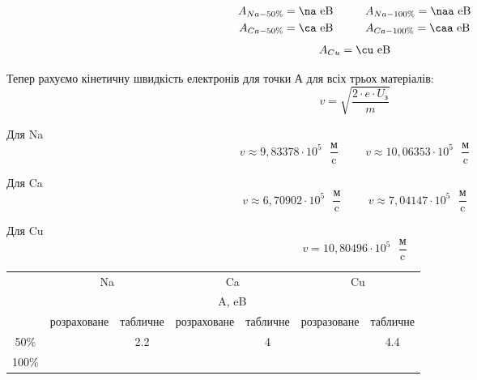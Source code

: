 \documentclass[a4paper,14pt]{extreport}
\begin{document}
	\begin{align*}
		A_{Na-50\%} &= \na \text{ eB} \hspace{1cm} A_{Na-100\%} = \naa \text{ eB}\\
		A_{Ca-50\%} &= \ca \text{ eB}\hspace{1cm}A_{Ca-100\%} = \caa \text{ eB}\\
	\end{align*}
	\begin{align*}
		A_{Cu} = \cu \text{ eB}\\
	\end{align*}
 

	Тепер рахуємо кінетичну швидкість електронів для точки А для всіх трьох матеріалів:
	\begin{equation}
		v = \sqrt{ \dfrac{2\cdot e\cdot U_{\text{з}}}{m} }
	\end{equation}



	Для Na
		$$v  \approx 9,83378\cdot 10^{5} \text{ }\dfrac{\text{м}}{\text{c}} \hspace{1cm}v \approx 10,06353 \cdot 10^{5}  \text{ }\dfrac{\text{м}}{\text{c}}$$
	

	Для Ca
		$$v\approx6,70902 \cdot 10^{5}  \text{ }\dfrac{\text{м}}{\text{c}} \hspace{1cm} v\approx 7,04147 \cdot 10^{5}  \text{ }\dfrac{\text{м}}{\text{c}}$$
	

	Для Cu
		$$v =  10,80496\cdot 10^{5} \text{ }\dfrac{\text{м}}{\text{c}} $$
	\clearpage 
	\newpage
	


\begin{table}[h]
	\begin{center}
		\begin{small}
			\begin{tabular}{|l|c|c|c|c|c|c|}
			\hline
			\multirow{3}{*}{} & \multicolumn{2}{c|}{Na} & \multicolumn{2}{c|}{Ca} & \multicolumn{2}{c|}{Cu} \\ \cline{2-7} 
			 & \multicolumn{6}{c|}{A, eB} \\ \cline{2-7} 
			 & розраховане & табличне & розраховане & табличне & розразоване & табличне \\ \hline
			\multicolumn{1}{|c|}{50\%} & \na & \multirow{2}{*}{2.2} & \ca & \multirow{2}{*}{4} & \cu & \multirow{2}{*}{4.4} \\ \cline{1-2} \cline{4-4} \cline{6-6}
			\multicolumn{1}{|c|}{100\%} & \naa &  & \caa &  & \cu &  \\ \hline
			\end{tabular}
		\end{small}
	\end{center}
\end{table}
\end{document}
